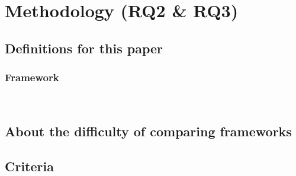 \chapter{Methodology (RQ2 \& RQ3)}
\section{Definitions for this paper}
\subsection{Framework}~\label{def:framework}
\section{About the difficulty of comparing frameworks}
\section{Criteria}

